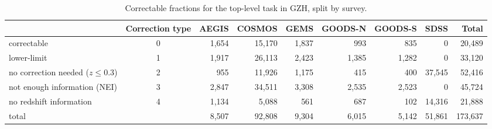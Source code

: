 \documentclass[twocolumn]{aastex6}
\begin{document}
\begin{table}
\caption{Correctable fractions for the top-level task in GZH, split by survey.}\label{tbl:hubble_debiasable}
\begin{tabular}{lcrrrrrrr}
\hline\hline
                                   & Correction type & AEGIS   & COSMOS & GEMS & GOODS-N & GOODS-S    & SDSS    & Total \\
\hline
correctable                        & 0               & 1,654   & 15,170 & 1,837 & 993    & 835     	& 0       & 20,489\\
lower-limit                        & 1               & 1,917   & 26,113 & 2,423 & 1,385  & 1,282   	& 0       & 33,120\\
no correction needed ($z \le 0.3$) & 2               & 955     & 11,926 & 1,175 & 415    & 400     	& 37,545  & 52,416\\ 
not enough information (NEI)       & 3               & 2,847   & 34,511 & 3,308 & 2,535  & 2,523   	& 0       & 45,724\\
no redshift information            & 4               & 1,134   & 5,088  & 561   & 687    & 102   		& 14,316  & 21,888\\
\hline
total                              &                 & 8,507   & 92,808 & 9,304 & 6,015  & 5,142   	& 51,861  & 173,637\\
\hline\hline
\end{tabular}
\end{table}

\end{document}
